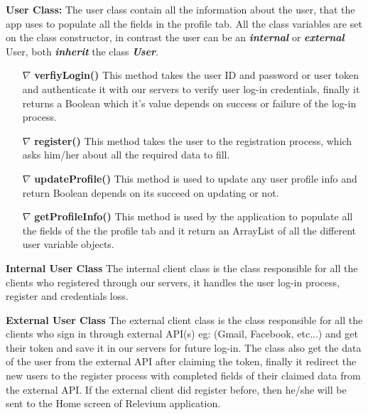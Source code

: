 \documentclass{scrreprt}
\begin{document}
     \textbf{User Class:} The user class contain all the information about the user, that the app uses to populate all the fields in the profile tab. All the class variables are set on the class constructor, in contrast the user can be an \textbf{\textit{internal}} or \textbf{\textit{external}} User, both \textit{\textbf{inherit}}  the class \textbf{\textit{User}}.
\begin{itemize}


\item[$\nabla$]  \textbf{verfiyLogin()}  This method takes the user ID and password or user token and authenticate it with our servers to verify user log-in credentials, finally it returns a Boolean which it's value depends on success or failure of the log-in process.
\item[$\nabla$] \textbf{register()} This method takes the user to the registration process, which asks him/her about all the required data to fill.
\item[$\nabla$] \textbf{updateProfile()} This method is used to update any user profile info and return Boolean depends on its succeed on updating or not.
\item[$\nabla$] \textbf{getProfileInfo()} This method is used by the application to populate all the fields of the the profile tab and it return an ArrayList of all the different user variable objects.

\end{itemize}

 \textbf{Internal User Class}  The internal client class is the class responsible for all the clients who registered through our servers, it handles the user log-in process, register and credentials loss.
 
 \textbf{External User Class} The external client class is the class responsible for all the clients who sign in through external API(s) eg: (Gmail, Facebook, etc...) and get their token and save it in our servers for future log-in. The class also get the data of the user from the external API after claiming the token, finally it redirect the new users to the register process with completed fields of their claimed data from the external API. If the external client did register before, then he/she will be sent to the Home screen of Relevium application.
\end{document}
